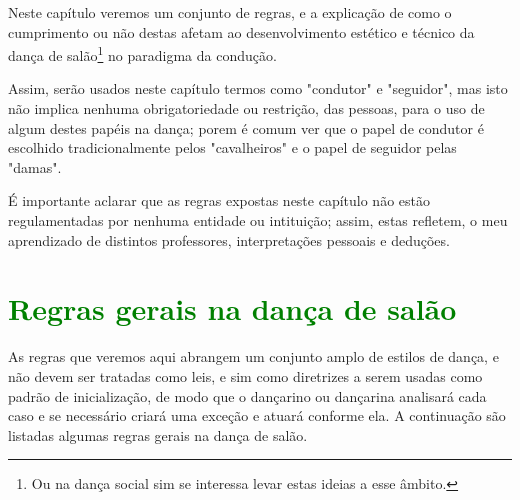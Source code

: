Neste capítulo veremos um conjunto de regras, e a explicação de como o cumprimento
ou não destas afetam ao desenvolvimento estético e técnico da dança de 
salão\footnote{Ou na dança social sim se interessa levar estas ideias a esse âmbito.}  no paradigma da condução.

Assim, serão usados neste capítulo termos como "condutor" e "seguidor", 
mas isto não implica nenhuma obrigatoriedade ou restrição, das pessoas, para o uso de algum destes papéis na dança;
porem é comum ver que o papel de condutor é escolhido tradicionalmente pelos "cavalheiros" e o papel de seguidor pelas "damas".
\begin{lattention}
É importante aclarar
que as regras expostas neste capítulo não estão regulamentadas por nenhuma entidade ou intituição; assim, estas
refletem, o meu aprendizado de distintos professores,
interpretações pessoais  e deduções. 
\end{lattention}

\section{\textcolor{green}{Regras gerais na dança de salão}}
As regras que veremos aqui abrangem um conjunto amplo de estilos de 
dança, e não devem ser
tratadas como leis, e sim como diretrizes a serem usadas como padrão de inicialização, de modo que 
o dançarino ou dançarina analisará cada caso e se necessário criará uma exceção e atuará conforme ela.
A continuação são listadas algumas regras gerais na dança de salão.\\

